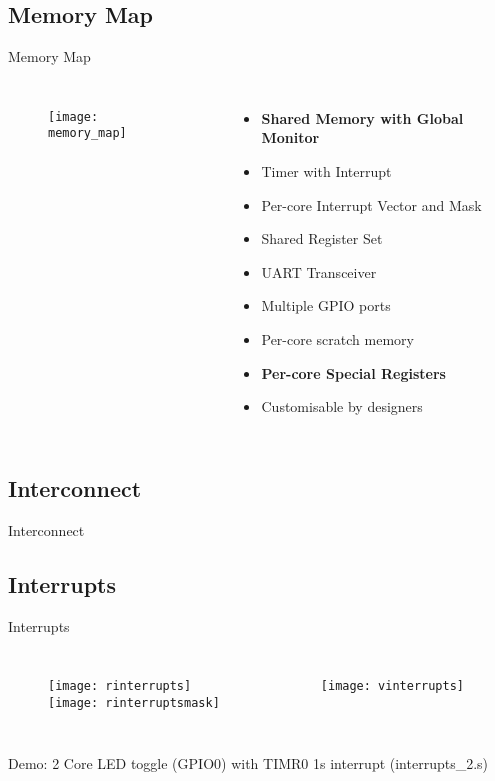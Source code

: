 \documentclass[aspectratio=169]{beamer}
\begin{document}
\subsection{Memory Map}
\begin{frame}{Memory Map}
\begin{columns}
\begin{figure}
\texttt{[image: memory\_map]}
\end{figure}
\begin{itemize}
    \item \textbf{Shared Memory with Global Monitor}
    \item Timer with Interrupt
    \item Per-core Interrupt Vector and Mask
    \item Shared Register Set
    \item UART Transceiver
    \item Multiple GPIO ports
    \item Per-core scratch memory
    \item \textbf{Per-core Special Registers}
    \item Customisable by designers
\end{itemize}
\end{columns}
\end{frame}

\subsection{Interconnect}
\begin{frame}{Interconnect}

\end{frame}

\subsection{Interrupts}
\begin{frame}[t]{Interrupts}
\begin{columns}[t]
\begin{figure}
\texttt{[image: rinterrupts]}\\
\vspace{.5cm}
\texttt{[image: rinterruptsmask]}
\end{figure}
\begin{figure}
\texttt{[image: vinterrupts]}
\end{figure}
\end{columns}
\vspace{1cm}
Demo: 2 Core LED toggle (GPIO0) with TIMR0 1s interrupt (interrupts\_2.s)
\end{frame}
\end{document}
